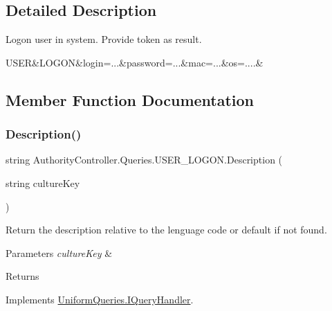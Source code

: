 \subsection{Detailed Description}
Logon user in system. Provide token as result. 

U\+S\+ER\&L\+O\+G\+ON\&login=...\&password=...\&mac=...\&os=....\& 

\subsection{Member Function Documentation}
\mbox{\label{class_authority_controller_1_1_queries_1_1_u_s_e_r___l_o_g_o_n_af448426be46032c3ae103cdf4ea5f40b}} 
\subsubsection{\texorpdfstring{Description()}{Description()}}
{\footnotesize\ttfamily string Authority\+Controller.\+Queries.\+U\+S\+E\+R\+\_\+\+L\+O\+G\+O\+N.\+Description (\begin{DoxyParamCaption}\item[{string}]{culture\+Key }\end{DoxyParamCaption})}



Return the description relative to the lenguage code or default if not found. 


\begin{DoxyParams}{Parameters}
{\em culture\+Key} & \\
\hline
\end{DoxyParams}
\begin{DoxyReturn}{Returns}

\end{DoxyReturn}


Implements \mbox{\hyperlink{interface_uniform_queries_1_1_i_query_handler_abe2d1124630ca8d74b7398d11c873526}{Uniform\+Queries.\+I\+Query\+Handler}}.

\mbox{\label{class_authority_controller_1_1_queries_1_1_u_s_e_r___l_o_g_o_n_a001f81c71597259636be777078e50f7e}} 
